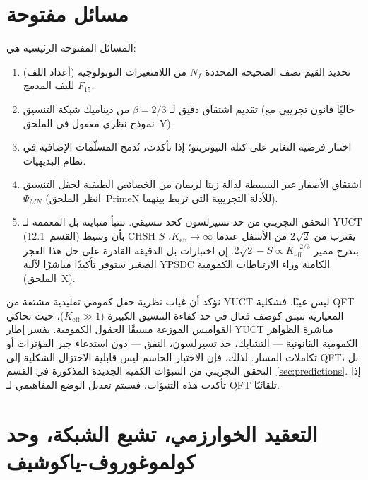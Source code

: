 \documentclass[11pt,a4paper]{article}
\begin{document}
	\section{مسائل مفتوحة}
	\label{sec:open}
	
	المسائل المفتوحة الرئيسية هي:
	
	\begin{enumerate}[label=(\roman*)]
		\item تحديد القيم نصف الصحيحة المحددة \(N_f\) من اللامتغيرات التوبولوجية (أعداد اللف) لليف المدمج \(F_{15}\).
		\item تقديم اشتقاق دقيق لـ \(\beta = 2/3\) من ديناميك شبكة التنسيق (حاليًا قانون تجريبي مع نموذج نظري معقول في الملحق~Y).
		\item اختبار فرضية التغاير على كتلة النيوترينو؛ إذا تأكدت، تُدمج المسلّمات الإضافية في نظام البديهيات.
		\item اشتقاق الأصفار غير البسيطة لدالة زيتا لريمان من الخصائص الطيفية لحقل التنسيق \(\Psi_{MN}\) (انظر الملحق~PrimeN للأدلة التجريبية التي تربط بينهما).
		\item التحقق التجريبي من حد تسيرلسون كحد تنسيقي. تتنبأ متباينة بل المعممة لـ YUCT (القسم~12.1) بأن وسيط CHSH \(S\) يقترب من \(2\sqrt{2}\) من الأسفل عندما \(K_{\mathrm{eff}} \to \infty\)، بتدرج مميز \(2\sqrt{2} - S \propto K_{\mathrm{eff}}^{-2/3}\). إن اختبارات بل الدقيقة القادرة على حل هذا العجز الصغير ستوفر تأكيدًا مباشرًا لآلية YPSDC الكامنة وراء الارتباطات الكمومية (الملحق~X).
	\end{enumerate}
	
	نؤكد أن غياب نظرية حقل كمومي تقليدية مشتقة من YUCT ليس عيبًا. فشكلية QFT المعيارية تنبثق كوصف فعال في حد كفاءة التنسيق الكبيرة (\(K_{\mathrm{eff}} \gg 1\))، حيث تحاكي القواميس الموزعة مسبقًا الحقول الكمومية. يفسر إطار YUCT مباشرة الظواهر الكمومية القانونية — التشابك، حد تسيرلسون، النفق — دون استدعاء جبر المؤثرات أو تكاملات المسار. لذلك، فإن الاختبار الحاسم ليس قابلية الاختزال الشكلية إلى QFT، بل التحقق التجريبي من التنبؤات الكمية الجديدة المذكورة في القسم~\ref{sec:predictions}. إذا تأكدت هذه التنبؤات، فسيتم تعديل الوضع المفاهيمي لـ QFT تلقائيًا.
	
	\sloppy
	\section{التعقيد الخوارزمي، تشبع الشبكة، وحد كولموغوروف-ياكوشيف}
	\label{sec:complexity}
	
\end{document}
